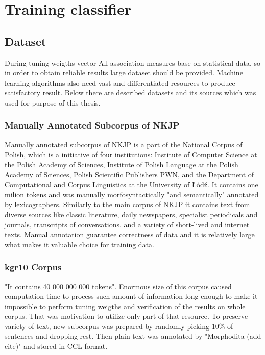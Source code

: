 \chapter{Training classifier}

\section{Dataset}
During tuning weigths vector 
All association measures base on statistical data, so in order to obtain reliable results large dataset should be provided.
Machine learning algorithms also need vast and differentiated resources to produce satisfactory result.
Below there are described datasets and its sources which was used for purpose of this thesis.

\subsection{Manually Annotated Subcorpus of NKJP}
Manually annotated subcorpus of NKJP is a part of the National Corpus of Polish, which is a initiative of four institutions: 
Institute of Computer Science at the Polish Academy of Sciences, Institute of Polish Language at the Polish Academy of Sciences, 
Polish Scientific Publishers PWN, and the Department of Computational and Corpus Linguistics at the University of Łódź.
It contains one milion tokens and was manually morfosyntactically "and semantically" annotated by lexicographers. 
Similarly to the main corpus of NKJP it contains text from diverse sources like classic literature, daily newspapers, 
specialist periodicals and journals, transcripts of conversations, and a variety of short-lived and internet texts. 
Manual annotation guarantee correctness of data and it is relatively large what makes it valuable choice for training data.

\subsection{kgr10 Corpus}
"It contains 40 000 000 000 tokens". Enormous size of this corpus caused computation time to process such amount of information 
long enough to make it impossible to perform tuning weigths and verification of the results on whole corpus. 
That was motivation to utilize only part of that resource. To preserve variety of text, new subcorpus was prepared by randomly picking 
10\% of sentences and dropping rest. Then plain text was annotated by "Morphodita (add cite)" and stored in CCL format.

